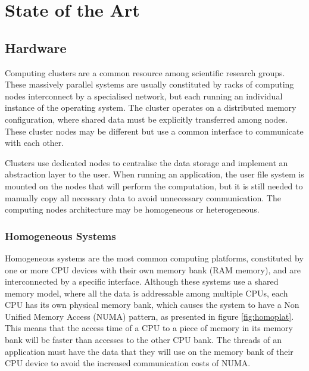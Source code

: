 
\chapter{State of the Art}
\label{state_of_the_art}

\section{Hardware}
\label{hardware}

Computing clusters are a common resource among scientific research groups. These massively parallel systems are usually constituted by racks of computing nodes interconnect by a specialised network, but each running an individual instance of the operating system. The cluster operates on a distributed memory configuration, where shared data must be explicitly transferred among nodes. These cluster nodes may be different but use a common interface to communicate with each other.

Clusters use dedicated nodes to centralise the data storage and implement an abstraction layer to the user. When running an application, the user file system is mounted on the nodes that will perform the computation, but it is still needed to manually copy all necessary data to avoid unnecessary communication. The computing nodes architecture may be homogeneous or heterogeneous.

\subsection{Homogeneous Systems}
\label{homo_systems}

Homogeneous systems are the most common computing platforms, constituted by one or more CPU devices with their own memory bank (RAM memory), and are interconnected by a specific interface. Although these systems use a shared memory model, where all the data is addressable among multiple CPUs, each CPU has its own physical memory bank, which causes the system to have a Non Unified Memory Access (NUMA) pattern, as presented in figure \ref{fig:homoplat}. This means that the access time of a CPU to a piece of memory in its memory bank will be faster than accesses to the other CPU bank. The threads of an application must have the data that they will use on the memory bank of their CPU device to avoid the increased communication costs of NUMA.

